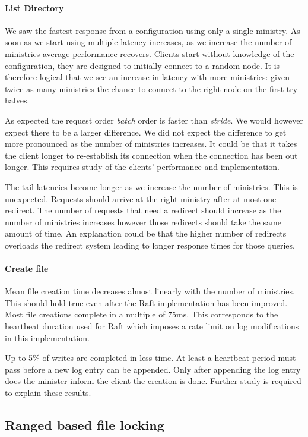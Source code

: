\paragraph{List Directory}
We saw the fastest response from a \name{} configuration using only a single ministry. As soon as we start using multiple latency increases, as we increase the number of ministries average performance recovers. Clients start without knowledge of the configuration, they are designed to initially connect to a random node. It is therefore logical that we see an increase in latency with more ministries: given twice as many ministries the chance to connect to the right node on the first try halves. 

As expected the request order \textit{batch} order is faster than \textit{stride}. We would however expect there to be a larger difference. We did not expect the difference to get more pronounced as the number of ministries increases. It could be that it takes the client longer to re-establish its connection when the connection has been out longer. This requires study of the clients' performance and implementation.

The tail latencies become longer as we increase the number of ministries. This is unexpected. Requests should arrive at the right ministry after at most one redirect. The number of requests that need a redirect should increase as the number of ministries increases however those redirects should take the same amount of time. An explanation could be that the higher number of redirects overloads the redirect system leading to longer response times for those queries.
%
\paragraph{Create file} 
Mean file creation time decreases almost linearly with the number of ministries. This should hold true even after the Raft implementation has been improved. Most file creations complete in a multiple of 75ms. This corresponds to the heartbeat duration used for Raft which imposes a rate limit on log modifications in this implementation. 

Up to 5\% of writes are completed in less time. At least a heartbeat period must pass before a new log entry can be appended. Only after appending the log entry does the minister inform the client the creation is done. Further study is required to explain these results.
%
\clearpage
\subsection{Ranged based file locking}
